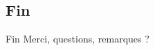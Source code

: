 \documentclass{beamer}
\begin{document}
  \subsection{Fin}
  \begin{frame}{Fin}
    Merci, questions, remarques ?
  \end{frame}
\end{document}
